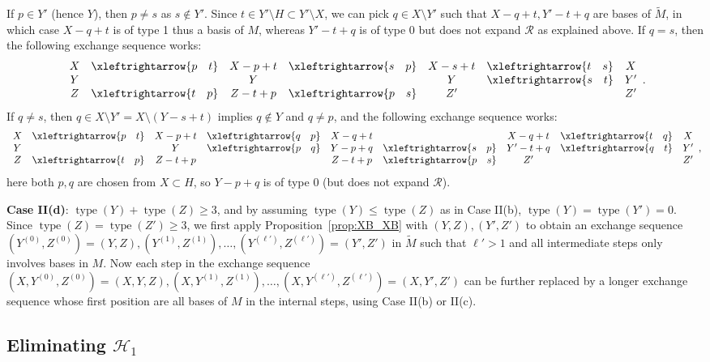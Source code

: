 \documentclass{amsart}
\newcommand{\swap}[2]{\xleftrightarrow{#1 \quad #2}}
\newcommand\Hcal{{\mathcal H}}
\newcommand\Rcal{{\mathcal R}}
\DeclareMathOperator{\type}{type}
\begin{document}
If $p\in Y'$ (hence $Y$), then $p\neq s$ as $s\not\in Y'$. Since $t\in Y'\setminus H\subset Y'\setminus X$, we can pick $q\in X\setminus Y'$ such that $X-q+t, Y'-t+q$ are bases of $\widetilde{M}$, in which case $X-q+t$ is of type 1 thus a basis of $M$, whereas $Y'-t+q$ is of type 0 but does not expand $\Rcal$ as explained above. If $q=s$, then the following exchange sequence works:
$$
    \begin{array}{c c c c c c c}
        X & \swap{p}{t} & X - p + t 
                      & \swap{s}{p} & X - s + t 
                      & \swap{t}{s} & X\\
        Y &             & Y
                       &             & Y
                      & \swap{s}{t} & Y' \\
        Z & \swap{t}{p} & Z-t+p 
                      & \swap{p}{s} & Z' 
                      &             & Z'
    \end{array}.
$$
If $q\neq s$, then $q\in X\setminus Y'=X\setminus (Y-s+t)$ implies $q\not\in Y$ and $q\neq p$, and the following exchange sequence works:
$$
    \begin{array}{c c c c c c c c c}
        X & \swap{p}{t} & X-p+t & \swap{q}{p} & X-q+t &             & X-q+t & \swap{t}{q} & X\\
        Y &             & Y    & \swap{p}{q} & Y-p+q & \swap{s}{p} & Y'-t+q & \swap{q}{t} & Y'\\
        Z  & \swap{t}{p} & Z-t+p &           & Z-t+p & \swap{p}{s} & Z'     &             & Z'
        \end{array},
$$
here both $p,q$ are chosen from $X\subset H$, so $Y-p+q$ is of type 0 (but does not expand $\Rcal$).

{\bf Case II(d)}: $\type(Y)+\type(Z)\geq 3$, and by assuming $\type(Y)\leq\type(Z)$ as in Case II(b), $\type(Y)=\type(Y')=0$. Since $\type(Z)=\type(Z')\geq 3$, we first apply Proposition~\ref{prop:XB_XB} with $(Y,Z),(Y',Z')$ to obtain an exchange sequence $(Y^{(0)},Z^{(0)})=(Y,Z),(Y^{(1)}, Z^{(1)}),\ldots,(Y^{(\ell')},Z^{(\ell')})=(Y',Z')$ in $\widetilde{M}$ such that $\ell'>1$ and all intermediate steps only involves bases in $M$. Now each step in the exchange sequence $(X,Y^{(0)},Z^{(0)})=(X,Y,Z),(X,Y^{(1)}, Z^{(1)}),\ldots,(X,Y^{(\ell')},Z^{(\ell')})=(X,Y',Z')$ can be further replaced by a longer exchange sequence whose first position are all bases of $M$ in the internal steps, using Case II(b) or II(c).

\subsection{Eliminating $\Hcal_1$}
\end{document}
